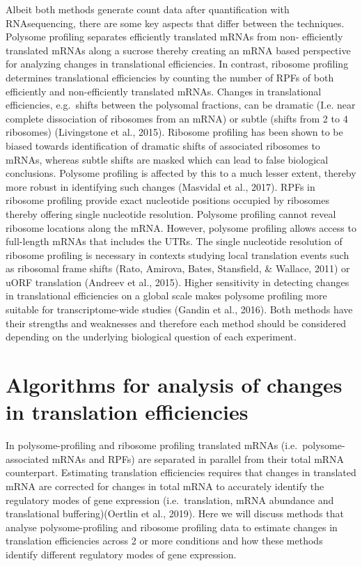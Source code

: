 \documentclass[12pt,openany]{book}
\begin{document}
Albeit both methods generate count data after quantification with
RNAsequencing, there are some key aspects that differ between the
techniques. Polysome profiling separates efficiently translated mRNAs
from non- efficiently translated mRNAs along a sucrose thereby creating
an mRNA based perspective for analyzing changes in translational
efficiencies. In contrast, ribosome profiling determines translational
efficiencies by counting the number of RPFs of both efficiently and
non-efficiently translated mRNAs. Changes in translational efficiencies,
e.g.~shifts between the polysomal fractions, can be dramatic (I.e. near
complete dissociation of ribosomes from an mRNA) or subtle (shifts from
2 to 4 ribosomes) (Livingstone et al., 2015). Ribosome profiling has
been shown to be biased towards identification of dramatic shifts of
associated ribosomes to mRNAs, whereas subtle shifts are masked which
can lead to false biological conclusions. Polysome profiling is affected
by this to a much lesser extent, thereby more robust in identifying such
changes (Masvidal et al., 2017). RPFs in ribosome profiling provide
exact nucleotide positions occupied by ribosomes thereby offering single
nucleotide resolution. Polysome profiling cannot reveal ribosome
locations along the mRNA. However, polysome profiling allows access to
full-length mRNAs that includes the UTRs. The single nucleotide
resolution of ribosome profiling is necessary in contexts studying local
translation events such as ribosomal frame shifts (Rato, Amirova, Bates,
Stansfield, \& Wallace, 2011) or uORF translation (Andreev et al.,
2015). Higher sensitivity in detecting changes in translational
efficiencies on a global scale makes polysome profiling more suitable
for transcriptome-wide studies (Gandin et al., 2016). Both methods have
their strengths and weaknesses and therefore each method should be
considered depending on the underlying biological question of each
experiment.

\section{Algorithms for analysis of changes in translation efficiencies}

In polysome-profiling and ribosome profiling translated mRNAs
(i.e.~polysome-associated mRNAs and RPFs) are separated in parallel from
their total mRNA counterpart. Estimating translation efficiencies
requires that changes in translated mRNA are corrected for changes in
total mRNA to accurately identify the regulatory modes of gene
expression (i.e.~translation, mRNA abundance and translational
buffering)(Oertlin et al., 2019). Here we will discuss methods that
analyse polysome-profiling and ribosome profiling data to estimate
changes in translation efficiencies across 2 or more conditions and how
these methods identify different regulatory modes of gene expression.
\end{document}
